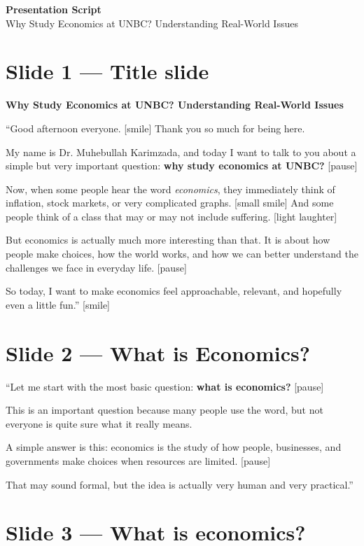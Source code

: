 \documentclass[12pt]{article}
\begin{document}
\begin{center}
    {\LARGE \textbf{Presentation Script}}\\[0.5em]
    {\large Why Study Economics at UNBC? Understanding Real-World Issues}
\end{center}

\section*{Slide 1 --- Title slide}
\textbf{Why Study Economics at UNBC? Understanding Real-World Issues}

``Good afternoon everyone. [smile] Thank you so much for being here.

My name is Dr. Muhebullah Karimzada, and today I want to talk to you about a simple but very important question: \textbf{why study economics at UNBC?} [pause]

Now, when some people hear the word \textit{economics}, they immediately think of inflation, stock markets, or very complicated graphs. [small smile] And some people think of a class that may or may not include suffering. [light laughter]

But economics is actually much more interesting than that. It is about how people make choices, how the world works, and how we can better understand the challenges we face in everyday life. [pause]

So today, I want to make economics feel approachable, relevant, and hopefully even a little fun.'' [smile]

\section*{Slide 2 --- What is Economics?}

``Let me start with the most basic question: \textbf{what is economics?} [pause]

This is an important question because many people use the word, but not everyone is quite sure what it really means.

A simple answer is this: economics is the study of how people, businesses, and governments make choices when resources are limited. [pause]

That may sound formal, but the idea is actually very human and very practical.''

\newpage
\section*{Slide 3 --- What is economics?}
\end{document}
